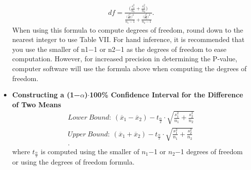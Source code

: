 \documentclass{report}
\begin{document}
\begin{itemize}
            \bigbreak \noindent 
            \begin{align*}
                df = \frac{\bigg(\frac{s_{1}^{2}}{n_{1}} + \frac{s_{2}^{2}}{n_{2}}\bigg)}{\frac{\bigg(\frac{s_{1}^{2}}{n_{1}}\bigg)^{2}}{n_{1}-1}+ \frac{\bigg(\frac{s_{2}^{2}}{n_{2}}\bigg)^{2}}{n_{2}-1}}
            .\end{align*}
            \bigbreak \noindent 
            When using this formula to compute degrees of freedom, round down to the nearest integer to use Table VII. For hand inference, it is recommended that you use the smaller of n1−1 or n2−1 as the degrees of freedom to ease computation. However, for increased precision in determining the P-value, computer software will use the formula above when computing the degrees of freedom.
        \item \textbf{Constructing a (1−$\alpha$)$\cdot  $100\% Confidence Interval for the Difference of Two Means}
            \begin{align*}
                Lower\ Bound:\ (\overline{x}_{1} - \overline{x}_{2}) - t_{\frac{\alpha}{2}} \cdot \sqrt{\frac{s_{1}^{2}}{n_{1}} + \frac{s_{2}^{2}}{n_{2}}} \\
                Upper\ Bound:\ (\overline{x}_{1} + \overline{x}_{2}) - t_{\frac{\alpha}{2}} \cdot \sqrt{\frac{s_{1}^{2}}{n_{1}} + \frac{s_{2}^{2}}{n_{2}}} \\
            .\end{align*}
            where $t_{\frac{\alpha}{2}} $ is computed using the smaller of $n_{1} $−1 or $n_{2}$−1 degrees of freedom or using the degrees of freedom formula.
    \end{itemize}
    \pagebreak \bigbreak \noindent 


    
\end{document}
